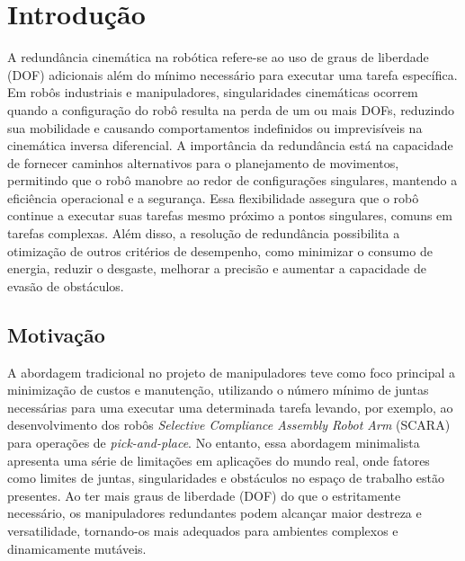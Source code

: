 \chapter{Introdução}\label{cap:introduction}

A redundância cinemática na robótica refere-se ao uso de graus de liberdade (DOF) adicionais além do mínimo necessário para executar uma
tarefa específica. Em robôs industriais e manipuladores, singularidades cinemáticas ocorrem quando a configuração do robô resulta na perda de um ou mais DOFs, 
reduzindo sua mobilidade e causando comportamentos indefinidos ou imprevisíveis na cinemática inversa diferencial. A importância da redundância está na capacidade de 
fornecer caminhos alternativos para o planejamento de movimentos, permitindo que o robô manobre ao redor de configurações singulares, mantendo a eficiência operacional e a segurança. Essa
flexibilidade assegura que o robô continue a executar suas tarefas mesmo próximo a pontos singulares, comuns em tarefas complexas. Além disso, a resolução
de redundância possibilita a otimização de outros critérios de desempenho, como minimizar o consumo de energia, reduzir o desgaste, melhorar a precisão e
aumentar a capacidade de evasão de obstáculos.

\section{Motivação}\label{sec:motivation}

A abordagem tradicional no projeto de manipuladores teve como foco principal a minimização de custos e manutenção,
utilizando o número mínimo de juntas necessárias para uma executar uma determinada tarefa levando, por exemplo, ao
desenvolvimento dos robôs \emph{Selective Compliance Assembly Robot Arm} (SCARA) para operações de \emph{pick-and-place}.
No entanto, essa abordagem  minimalista apresenta uma série de limitações em aplicações do mundo real, onde fatores como
limites de juntas, singularidades e obstáculos no espaço de trabalho estão presentes. Ao ter mais graus de liberdade (DOF)
do que o estritamente necessário, os manipuladores redundantes podem alcançar maior destreza e versatilidade, tornando-os
mais adequados para ambientes complexos e dinamicamente mutáveis.

